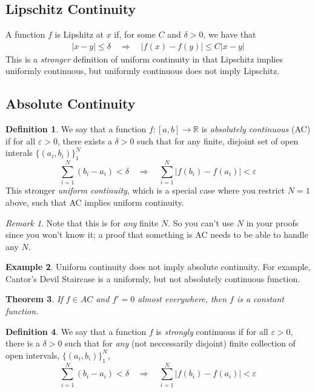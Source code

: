 \documentclass[12pt]{article}
\theoremstyle{plain}
\newtheorem{thm}{Theorem}[subsection]
\theoremstyle{definition}
\newtheorem{defn}[thm]{Definition}
\newtheorem{ex}[thm]{Example}
\theoremstyle{remark}
\newtheorem*{rmk}{Remark}
\begin{document}
\subsection{Lipschitz Continuity} 

A function $f$ is Lipshitz at $x$ if, for some $C$ and $\delta>0$, we have that 
\begin{align*}
    |x-y|\leq \delta \quad \Rightarrow \quad 
        |f(x) - f(y)|\leq C|x-y|
\end{align*}
This is a \emph{stronger} definition of uniform continuity in that Lipschitz implies uniformly continuous, but uniformly continuous does not imply Lipschitz. 


\subsection{Absolute Continuity \label{app.abscont}}

\begin{defn}
We say that a function $f:[a,b]\rightarrow\mathbb{R}$ is \emph{absolutely continuous} (AC) if for all $\varepsilon>0$, there exists a $\delta>0$ such that for any finite, disjoint set of open interals $\{(a_i,b_i)\}_1^N$ 
\[
    \sum_{i=1}^N (b_i-a_i)<\delta
    \quad\Rightarrow\quad
    \sum_{i=1}^N |f(b_i)-f(a_i)|<\varepsilon
\]
This stronger \emph{uniform continuity}, which is a special case where you restrict $N=1$ above, such that AC implies uniform continuity.
\end{defn}
\begin{rmk}
Note that this is for \emph{any} finite $N$. So you can't use $N$ in your proofs since you won't know it; a proof that something is AC needs to be able to handle any $N$. 
\end{rmk}

\begin{ex}
Uniform continuity does not imply absolute continuity. For example, Cantor's Devil Staircase is a uniformly, but not absolutely continuous function.
\end{ex}

\begin{thm}
If $f\in AC$ and $f'=0$ almost everywhere, then $f$ is a constant function.
\end{thm}

\begin{defn}
We say that a function $f$ is \emph{strongly} continuous if for all $\varepsilon>0$, there is a $\delta>0$ such that for \emph{any} (not neccessarily disjoint) finite collection of open intervals, $\{(a_i,b_i)\}^N_1$, 
\[
    \sum_{i=1}^N (b_i-a_i) < \delta
    \quad\Rightarrow\quad
    \sum_{i=1}^N |f(b_i)-f(a_i)| <\varepsilon
\]
\end{defn}
\end{document}
